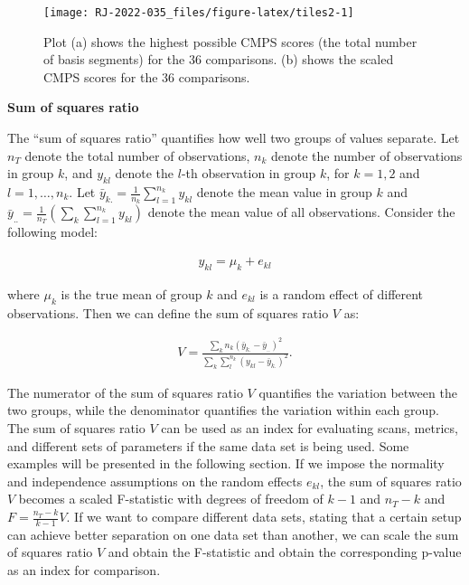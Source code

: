 \begin{figure}

{\centering \texttt{[image: RJ-2022-035\_files/figure-latex/tiles2-1]} 

}

\caption{Plot (a) shows the highest possible CMPS scores (the total number of basis segments) for the 36 comparisons. (b) shows the scaled CMPS scores for the 36 comparisons.}\label{fig:tiles2}
\end{figure}

\textbf{Sum of squares ratio}

The ``sum of squares ratio'' quantifies how well two groups of values separate.
Let \(n_T\) denote the total number of observations, \(n_k\) denote the number of observations in group \(k\), and \(y_{kl}\) denote the \(l\)-th observation in group \(k\), for \(k = 1,2\) and \(l = 1, \dots, n_k\).
Let \(\bar{y}_{k.} = \frac{1}{n_k} \sum_{l=1}^{n_k} y_{kl}\) denote the mean value in group \(k\) and \(\bar{y}_{..} = \frac{1}{n_T} \left( \sum_{k} \sum_{l = 1}^{n_k} y_{kl} \right)\) denote the mean value of all observations.
Consider the following model:

\begin{align}
y_{kl} = \mu_k + e_{kl}
\end{align}

where \(\mu_k\) is the true mean of group \(k\) and \(e_{kl}\) is a random effect of different observations.
Then we can define the sum of squares ratio \(V\) as:

\begin{align}
V = \frac{\sum_k n_k \left(\bar{y}_{k.} - \bar{y}_{..} \right)^2}{\sum_k \sum_l^{n_k} \left(y_{kl} - \bar{y}_{k.} \right)^2 }.
\end{align}

The numerator of the sum of squares ratio \(V\) quantifies the variation between the two groups, while the denominator quantifies the variation within each group.
The sum of squares ratio \(V\) can be used as an index for evaluating scans, metrics, and different sets of parameters if the same data set is being used.
Some examples will be presented in the following section.
If we impose the normality and independence assumptions on the random effects \(e_{kl}\), the sum of squares ratio \(V\) becomes a scaled F-statistic with degrees of freedom of \(k-1\) and \(n_T - k\) and \(F = \frac{n_T - k}{k- 1} V\).
If we want to compare different data sets, stating that a certain setup can achieve better separation on one data set than another, we can scale the sum of squares ratio \(V\) and obtain the F-statistic and obtain the corresponding p-value as an index for comparison.

